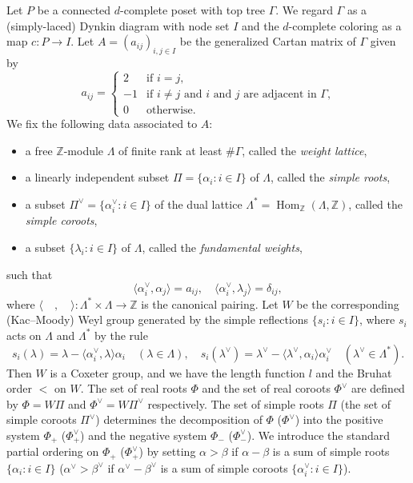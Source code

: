\documentclass[ALCO,ThmDefs,Unicode,epreuves]{cedram}
\newcommand\Int{\mathbb{Z}}
\DeclareMathOperator{\Hom}{Hom}
\begin{document}
Let $P$ be a connected $d$-complete poset with top tree $\Gamma$.
We regard $\Gamma$ as a (simply-laced) Dynkin diagram with node set $I$ 
and the $d$-complete coloring as a map $c : P \to I$.
Let $A = (a_{ij})_{i,j \in I}$ be the generalized Cartan matrix of $\Gamma$ given by
$$
a_{ij}
 =
\begin{cases}
 2 &\text{if $i=j$,} \\
 -1 &\text{if $i \neq j$ and $i$ and $j$ are adjacent in $\Gamma$,} \\
 0 &\text{otherwise.}
\end{cases}
$$
We fix the following data associated to $A$:
\begin{itemize}
\item
a free $\Int$-module $\Lambda$ of finite rank at least $\# \Gamma$, called the \emph{weight lattice},
\item
a linearly independent subset $\Pi = \{ \alpha_i : i \in I \}$ of $\Lambda$, called the \emph{simple roots},
\item
a subset $\Pi^\vee = \{ \alpha^\vee_i : i \in I \}$ of the dual lattice $\Lambda^* = \Hom_\Int(\Lambda,\Int)$, 
called the \emph{simple coroots},
\item
a subset $\{ \lambda_i : i \in I \}$ of $\Lambda$, called the \emph{fundamental weights},
\end{itemize}
such that
$$
\langle \alpha^\vee_i, \alpha_j \rangle = a_{ij},
\quad
\langle \alpha^\vee_i, \lambda_j \rangle = \delta_{ij},
$$
where $\langle \quad, \quad \rangle : \Lambda^* \times \Lambda \to \Int$ is the canonical pairing.
Let $W$ be the corresponding 
(Kac--Moody) Weyl group generated by the simple reflections $\{ s_i : i \in I \}$, 
where $s_i$ acts on $\Lambda$ and $\Lambda^*$ by the rule
$$
s_i(\lambda) = \lambda - \langle \alpha_i^\vee, \lambda \rangle \alpha_i
\quad(\lambda \in \Lambda),
\quad
s_i(\lambda^\vee) = \lambda^\vee - \langle \lambda^\vee, \alpha_i \rangle \alpha^\vee_i
\quad(\lambda^\vee \in \Lambda^*).
$$
Then $W$ is a Coxeter group, and we have the length function $l$ and the Bruhat order $<$ on $W$.
The set of real roots $\Phi$ and the set of real coroots $\Phi^\vee$ are defined by 
$\Phi = W \Pi$ and $\Phi^\vee = W \Pi^\vee$ respectively.
The set of simple roots $\Pi$ (\resp the set of simple coroots $\Pi^\vee$) determines 
the decomposition of $\Phi$ (\resp $\Phi^\vee$) into the positive system $\Phi_+$ (\resp $\Phi^\vee_+$) and 
the negative system $\Phi_-$ (\resp $\Phi^\vee_-$).
We introduce the standard partial ordering on $\Phi_+$ (\resp $\Phi^\vee_+$) by setting 
$\alpha > \beta$ if $\alpha - \beta$ is a sum of simple roots $\{ \alpha_i : i \in I \}$ 
(\resp $\alpha^\vee > \beta^\vee$ if $\alpha^\vee - \beta^\vee$ is a sum of simple coroots 
$\{ \alpha^\vee_i : i \in I \}$).
\end{document}

